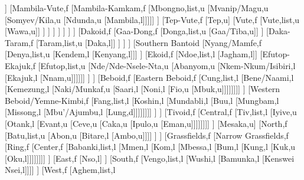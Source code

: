 \documentclass[landscape]{standalone}
\begin{document}
\begin{forest}
											[Kwanja,list,l
											[Twendi,l]]
											[Mambila-Vute,f
												[Mambila-Kamkam,f
													[Mbongno,list,u
													[Mvanip/Magu,u
													[Somyev/Kila,u
													[Ndunda,u
													[Mambila,l]]]]]
												]%
												[Tep-Vute,f
													[Tep,u]
													[Vute,f
														[Vute,list,u
														[Wawa,u]]
													]%
												]%
											]%
										]%
									]%
								]%
							]%
							[Dakoid,f
								[Gaa-Dong,f
									[Donga,list,u
									[Gaa/Tiba,u]]
								]%
								[Daka-Taram,f
									[Taram,list,u
									[Daka,l]]
								]%
							]%
						]%
						[Southern Bantoid
							[Nyang/Mamfe,f
								[Denya,list,u
								[Kendem,l
								[Kenyang,l]]]
							]%
							[Ekoid,f
								[Ndoe,list,l
								[Jagham,l]]
								[Efutop-Ekajuk,f
									[Efutop,list,u
									[Nde/Nde-Nsele-Nta,u
									[Abanyom,u
									[Nkem-Nkum/Isibiri,l
									[Ekajuk,l
									[Nnam,u]]]]]]
								]%
							]%
							[Beboid,f
								[Eastern Beboid,f
									[Cung,list,l
									[Bene/Naami,l
									[Kemezung,l
									[Naki/Munkaf,u
									[Saari,l
									[Noni,l
									[Fio,u
									[Mbuk,u]]]]]]]]
								]%
								[Western Beboid/Yemne-Kimbi,f
									[Fang,list,l
									[Koshin,l
									[Mundabli,l
									[Buu,l
									[Mungbam,l
									[Missong,l
									[Mbu'/Ajumbu,l
									[Lung,d]]]]]]]]
								]%
							]%
							[Tivoid,f
								[Central,f
									[Tiv,list,l
									[Iyive,u
									[Otank,l
									[Evant,u
									[Ceve,u
									[Caka,u
									[Ipulo,u
									[Eman,u]]]]]]]]
								]%
								[Mesaka,u]
								[North,f
									[Batu,list,u
									[Abon,u
									[Bitare,l
									[Ambo,u]]]]
								]%
							]%
							[Grassfields,f
								[Narrow Grassfields,f
									[Ring,f
										[Center,f
											[Babanki,list,l
											[Mmen,l
											[Kom,l
											[Mbessa,l
											[Bum,l
											[Kung,l
											[Kuk,u
											[Oku,l]]]]]]]]
										]%
										[East,f
											[Nso,l]
										]%
										[South,f
											[Vengo,list,l
											[Wushi,l
											[Bamunka,l
											[Kenswei Nsei,l]]]]
										]%
										[West,f
											[Aghem,list,l

\end{forest}
\end{document}
